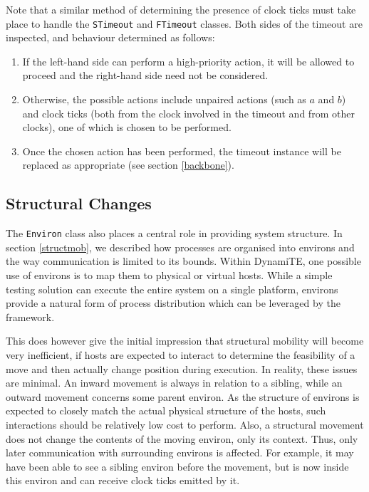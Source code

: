 \documentclass{acm_proc_article-sp}
\begin{document}
Note that a similar method of determining the presence of clock ticks
must take place to handle the \texttt{STimeout} and \texttt{FTimeout}
classes.  Both sides of the timeout are inspected, and behaviour
determined as follows:
\begin{enumerate}
\item If the left-hand side can perform a high-priority action, it will
      be allowed to proceed and the right-hand side need not be
      considered.
\item Otherwise, the possible actions include unpaired actions (such as
      $a$ and $b$) and clock ticks (both from the clock involved in the
      timeout and from other clocks), one of which is chosen to be
      performed.
\item Once the chosen action has been performed, the timeout instance
      will be replaced as appropriate (see section \ref{backbone}). 
\end{enumerate}

\subsection{Structural Changes}
\label{structchange}

The \texttt{Environ} class also places a central role in providing
system structure.  In section \ref{structmob}, we described how
processes are organised into environs and the way communication is
limited to its bounds.  Within DynamiTE, one possible use of environs
is to map them to physical or virtual hosts.  While a simple testing
solution can execute the entire system on a single platform, environs
provide a natural form of process distribution which can be leveraged by
the framework.

This does however give the initial impression that structural mobility
will become very inefficient, if hosts are expected to interact to
determine the feasibility of a move and then actually change position
during execution.  In reality, these issues are minimal.  An inward
movement is always in relation to a sibling, while an outward movement
concerns some parent environ.  As the structure of environs is expected
to closely match the actual physical structure of the hosts, such
interactions should be relatively low cost to perform.  Also, a
structural movement does not change the contents of the moving environ,
only its context.  Thus, only later communication with surrounding
environs is affected.  For example, it may have been able to see a
sibling environ before the movement, but is now inside this environ and
can receive clock ticks emitted by it.
\end{document}
